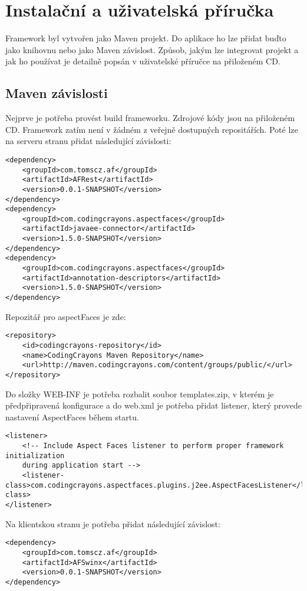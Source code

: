 \chapter{Instalační a uživatelská příručka}
Framework byl vytvořen jako Maven projekt. Do aplikace ho lze přidat buďto jako knihovnu nebo jako Maven závislost. Způsob, jakým lze integrovat projekt a jak ho používat je detailně popsán v uživatelské příručce na přiloženém CD. 
\section{Maven závislosti}
Nejprve je potřeba provést build frameworku. Zdrojové kódy jsou na přiloženém CD. Framework zatím není v žádném z veřejně dostupných repositářích. Poté lze na serveru stranu přidat následující závislosti:
\begin{lstlisting}[caption={Závislosti na serveru},
label={code:mavenDependency}, basicstyle=\footnotesize]
<dependency>
	<groupId>com.tomscz.af</groupId>
	<artifactId>AFRest</artifactId>
	<version>0.0.1-SNAPSHOT</version>
</dependency>
<dependency>
	<groupId>com.codingcrayons.aspectfaces</groupId>
	<artifactId>javaee-connector</artifactId>
	<version>1.5.0-SNAPSHOT</version>
</dependency>
<dependency>
	<groupId>com.codingcrayons.aspectfaces</groupId>
	<artifactId>annotation-descriptors</artifactId>
	<version>1.5.0-SNAPSHOT</version>
</dependency>
\end{lstlisting}
Repozitář pro aspectFaces je zde:
\begin{lstlisting}[caption={AspectFaces repozitář },
label={code:mavenAspectFacesRepo}]
<repository>
	<id>codingcrayons-repository</id>
	<name>CodingCrayons Maven Repository</name>
	<url>http://maven.codingcrayons.com/content/groups/public/</url>
</repository>
\end{lstlisting}
Do složky WEB-INF je potřeba rozbalit soubor templates.zip, v kterém je předpřipravená konfigurace a do web.xml je potřeba přidat listener, který provede nastavení AspectFaces během startu. 
\begin{lstlisting}[caption={AspectFaces listener},
label={code:mavenAspectFacesBootStrap}, basicstyle=\footnotesize]
<listener>
	<!-- Include Aspect Faces listener to perform proper framework initialization 
	during application start -->
	<listener-class>com.codingcrayons.aspectfaces.plugins.j2ee.AspectFacesListener</listener-class>
</listener>
\end{lstlisting}
Na klientskou stranu je potřeba přidat následující závislost:
\begin{lstlisting}[caption={Závislost na klientské straně},
label={code:mavenAFSwinx}, basicstyle=\footnotesize]
<dependency>
	<groupId>com.tomscz.af</groupId>
	<artifactId>AFSwinx</artifactId>
	<version>0.0.1-SNAPSHOT</version>
</dependency>
\end{lstlisting}
